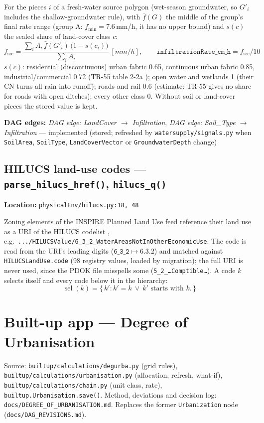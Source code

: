\documentclass[11pt]{article}
\newcommand{\code}[1]{\texttt{#1}}
\newcommand{\dagedge}[1]{\textit{DAG edge: #1}}
\newcommand{\statusdone}{\textcolor{green!50!black}{implemented}}
\begin{document}
For the pieces $i$ of a fresh-water source polygon (wet-season groundwater, so $G'_i$ includes the shallow-groundwater rule), with $\bar f(G)$ the middle of the group's final rate range (group A: $f_{\min} = 7.6$\,\si{mm/h}, it has no upper bound) and $s(c)$ the sealed share of land-cover class $c$:
\begin{equation}
  f_{\text{src}} = \frac{\sum_i A_i\, \bar f(G'_i)\,\bigl(1 - s(c_i)\bigr)}{\sum_i A_i}\ [\si{mm/h}], \qquad
  \texttt{infiltrationRate\_cm\_h} = f_{\text{src}} / 10
\end{equation}
$s(c)$: residential (discontinuous) urban fabric 0.65, continuous urban fabric 0.85, industrial/commercial 0.72 (TR-55 table 2-2a \cite{TR55}); open water and wetlands 1 (their CN turns all rain into runoff); roads and rail 0.6 (estimate: TR-55 gives no share for roads with open ditches); every other class 0. Without soil or land-cover pieces the stored value is kept.

\textbf{DAG edges:} \dagedge{LandCover $\rightarrow$ Infiltration}, \dagedge{Soil\_Type $\rightarrow$ Infiltration} --- \statusdone{} (stored; refreshed by \code{watersupply/signals.py} when \code{SoilArea}, \code{SoilType}, \code{LandCoverVector} or \code{GroundwaterDepth} change)

\subsection{HILUCS land-use codes --- \code{parse\_hilucs\_href()}, \code{hilucs\_q()}}
\textbf{Location:} \code{physicalEnv/hilucs.py:18, 48}

Zoning elements of the INSPIRE Planned Land Use feed reference their land use as a URI of the HILUCS codelist \cite{HILUCS}, e.g.\ \texttt{.../HILUCSValue/6\_3\_2\_WaterAreasNotInOtherEconomicUse}. The code is read from the URI's leading digits ($\texttt{6\_3\_2} \mapsto 6.3.2$) and matched against \code{HILUCSLandUse.code} (98 registry values, loaded by migration); the full URI is never used, since the PDOK file misspells some (\texttt{5\_2\_\ldots Comptible\ldots}). A code $k$ selects itself and every code below it in the hierarchy:
\begin{equation}
  \operatorname{sel}(k) = \{\, k' : k' = k \ \lor\ k' \text{ starts with } k. \,\}
\end{equation}

\section{Built-up app --- Degree of Urbanisation}
\label{sec:degurba}
Source: \code{builtup/calculations/degurba.py} (grid rules), \code{builtup/calculations/urbanisation.py} (allocation, refresh, what-if), \code{builtup/calculations/chain.py} (unit class, rate), \code{builtup.Urbanisation.save()}. Method, deviations and decision log: \code{docs/DEGREE\_OF\_URBANISATION.md}. Replaces the former \code{Urbanization} node (\code{docs/DAG\_REVISIONS.md}).
\end{document}
